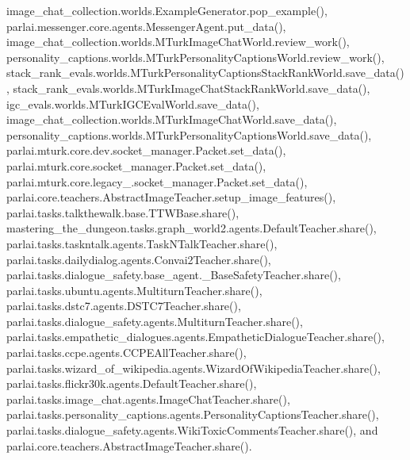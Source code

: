 image\+\_\+chat\+\_\+collection.\+worlds.\+Example\+Generator.\+pop\+\_\+example(), parlai.\+messenger.\+core.\+agents.\+Messenger\+Agent.\+put\+\_\+data(), image\+\_\+chat\+\_\+collection.\+worlds.\+M\+Turk\+Image\+Chat\+World.\+review\+\_\+work(), personality\+\_\+captions.\+worlds.\+M\+Turk\+Personality\+Captions\+World.\+review\+\_\+work(), stack\+\_\+rank\+\_\+evals.\+worlds.\+M\+Turk\+Personality\+Captions\+Stack\+Rank\+World.\+save\+\_\+data(), stack\+\_\+rank\+\_\+evals.\+worlds.\+M\+Turk\+Image\+Chat\+Stack\+Rank\+World.\+save\+\_\+data(), igc\+\_\+evals.\+worlds.\+M\+Turk\+I\+G\+C\+Eval\+World.\+save\+\_\+data(), image\+\_\+chat\+\_\+collection.\+worlds.\+M\+Turk\+Image\+Chat\+World.\+save\+\_\+data(), personality\+\_\+captions.\+worlds.\+M\+Turk\+Personality\+Captions\+World.\+save\+\_\+data(), parlai.\+mturk.\+core.\+dev.\+socket\+\_\+manager.\+Packet.\+set\+\_\+data(), parlai.\+mturk.\+core.\+socket\+\_\+manager.\+Packet.\+set\+\_\+data(), parlai.\+mturk.\+core.\+legacy\+\_.\+socket\+\_\+manager.\+Packet.\+set\+\_\+data(), parlai.\+core.\+teachers.\+Abstract\+Image\+Teacher.\+setup\+\_\+image\+\_\+features(), parlai.\+tasks.\+talkthewalk.\+base.\+T\+T\+W\+Base.\+share(), mastering\+\_\+the\+\_\+dungeon.\+tasks.\+graph\+\_\+world2.\+agents.\+Default\+Teacher.\+share(), parlai.\+tasks.\+taskntalk.\+agents.\+Task\+N\+Talk\+Teacher.\+share(), parlai.\+tasks.\+dailydialog.\+agents.\+Convai2\+Teacher.\+share(), parlai.\+tasks.\+dialogue\+\_\+safety.\+base\+\_\+agent.\+\_\+\+Base\+Safety\+Teacher.\+share(), parlai.\+tasks.\+ubuntu.\+agents.\+Multiturn\+Teacher.\+share(), parlai.\+tasks.\+dstc7.\+agents.\+D\+S\+T\+C7\+Teacher.\+share(), parlai.\+tasks.\+dialogue\+\_\+safety.\+agents.\+Multiturn\+Teacher.\+share(), parlai.\+tasks.\+empathetic\+\_\+dialogues.\+agents.\+Empathetic\+Dialogue\+Teacher.\+share(), parlai.\+tasks.\+ccpe.\+agents.\+C\+C\+P\+E\+All\+Teacher.\+share(), parlai.\+tasks.\+wizard\+\_\+of\+\_\+wikipedia.\+agents.\+Wizard\+Of\+Wikipedia\+Teacher.\+share(), parlai.\+tasks.\+flickr30k.\+agents.\+Default\+Teacher.\+share(), parlai.\+tasks.\+image\+\_\+chat.\+agents.\+Image\+Chat\+Teacher.\+share(), parlai.\+tasks.\+personality\+\_\+captions.\+agents.\+Personality\+Captions\+Teacher.\+share(), parlai.\+tasks.\+dialogue\+\_\+safety.\+agents.\+Wiki\+Toxic\+Comments\+Teacher.\+share(), and parlai.\+core.\+teachers.\+Abstract\+Image\+Teacher.\+share().

\mbox{\label{classparlai_1_1core_1_1teachers_1_1AbstractImageTeacher_a9fb2d3ab4b52f70872460c624bad1218}} 
